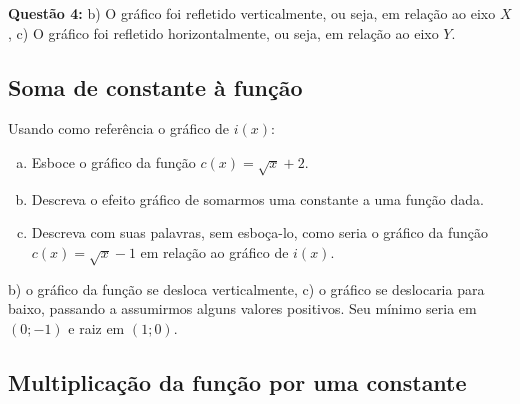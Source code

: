 \documentclass[main.tex]{subfiles}
\begin{document}

\begin{gabarito}
	\begin{gabaritoQuestao}
		\noindent\textbf{Questão 4:} b) O gráfico foi refletido verticalmente, ou seja, em relação ao eixo $X$, c) O gráfico foi refletido horizontalmente, ou seja, em relação ao eixo $Y$.
	\end{gabaritoQuestao}
\end{gabarito}

\subsection*{Soma de constante à função}

\begin{questao}
Usando como referência o gráfico de $i(x)$:
\begin{enumerate}[a)]
\item Esboce o gráfico da função $c(x)=\sqrt{x}+2$.
\item Descreva o efeito gráfico de somarmos uma constante a uma função dada.
\item Descreva com suas palavras, sem esboça-lo, como seria o gráfico da função $c(x)=\sqrt{x}-1$ em relação ao gráfico de $i(x)$.
\end{enumerate}
\end{questao}

\begin{gabarito}
	\begin{gabaritoQuestao}
		b) o gráfico da função se desloca verticalmente, c) o gráfico se deslocaria para baixo, passando a assumirmos alguns valores positivos. Seu mínimo seria em $(0;-1)$ e raiz em $(1;0)$.
	\end{gabaritoQuestao}
\end{gabarito}

\subsection*{Multiplicação da função por uma constante}
\end{document}
